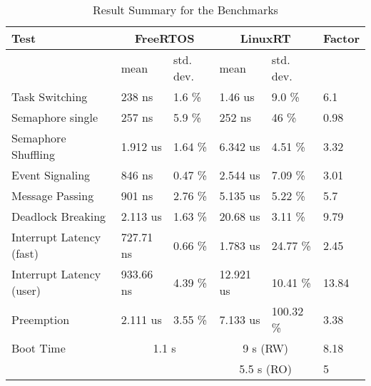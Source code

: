 \begin{table}[htbp]
	\centering
		\begin{tabular}{|l||l|l||l|l||l|}
			\hline
				Test & \multicolumn{2}{|c||}{FreeRTOS} & \multicolumn{2}{|c||}{LinuxRT}	& Factor				 	 \\
				\hline 
																						& mean			 & std. dev. 		 & mean			  & std. dev. 	&			 \\
				\hline 
				Task Switching											& 238 ns	 	 & 1.6 \%		 		 & 1.46 us	  & 9.0 \%			&	6.1	 \\
			  \hline
			  Semaphore single									  & 257 ns		 & 5.9 \%  			 & 252 ns		  &	46 \% 			&	0.98  \\
			  \hline 
			  Semaphore Shuffling 								& 1.912 us 	 & 1.64 \% 			 & 6.342 us  	&	4.51 \%			&	3.32  \\ 
			  \hline
			  Event Signaling											& 846 ns		 & 0.47 \% 			 & 2.544 us		& 7.09 \%			&	3.01  \\
			  \hline
			  Message Passing											& 901 ns		 & 2.76 \% 			 & 5.135 us		& 5.22 \%			&	5.7   \\
			  \hline
			  Deadlock Breaking										& 2.113 us	 & 1.63 \% 			 & 20.68 us		& 3.11 \%			&	9.79  \\
			  \hline
			  Interrupt Latency (fast)						& 727.71 ns	 & 0.66 \% 			 & 1.783 us		& 24.77 \%		&	2.45  \\
			  \hline
			  Interrupt Latency (user)						& 933.66 ns	 & 4.39 \% 			 & 12.921 us  & 10.41 \%		&	13.84 \\
			  \hline
			  Preemption													& 2.111 us	 & 3.55 \% 			 & 7.133 us		& 100.32 \%		&	3.38  \\
			  \hline
			  \hline
			  Boot Time											&  \multicolumn{2}{|c|}{1.1 s} & 	\multicolumn{2}{|c|}{9 s (RW)} & 8.18 \\ 
			  		 													&  \multicolumn{2}{|c|}{} 	 & 	\multicolumn{2}{|c|}{5.5 s (RO)} & 5 \\ 
			\hline
		\end{tabular}
	\caption{Result Summary for the Benchmarks}
	\label{tab_summary}
\end{table}

